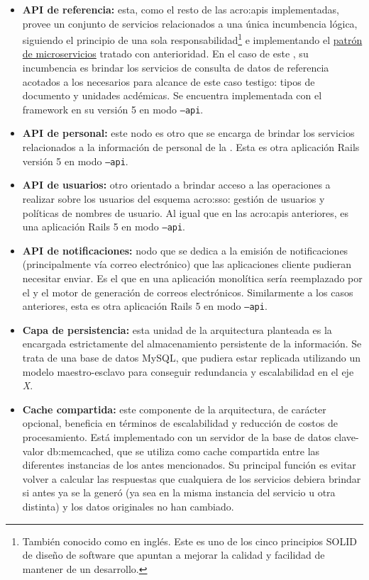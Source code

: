 \begin{itemize}
  \item \textbf{API de referencia:} esta, como el resto de las \glspl{acro:api} implementadas, provee un conjunto de servicios relacionados a una única incumbencia lógica, siguiendo el principio de una sola responsabilidad\footnote{También conocido como  en inglés. Este es uno de los cinco principios SOLID de diseño de software que apuntan a mejorar la calidad y facilidad de mantener de un desarrollo.} e implementando el \hyperref[microservicios]{patrón de microservicios} tratado con anterioridad. En el caso de este , su incumbencia es brindar los servicios de consulta de datos de referencia acotados a los necesarios para alcance de este caso testigo: tipos de documento y unidades acdémicas. Se encuentra implementada con el framework  en su versión 5 en modo \texttt{--api}.

  \item \textbf{API de personal:} este nodo es otro  que se encarga de brindar los servicios relacionados a la información de personal de la {\unlp}. Esta es otra aplicación Rails versión 5 en modo \texttt{--api}.

  \item \textbf{API de usuarios:} otro  orientado a brindar acceso a las operaciones a realizar sobre los usuarios del esquema \gls{acro:sso}: gestión de usuarios y políticas de nombres de usuario. Al igual que en las \glspl{acro:api} anteriores, es una aplicación Rails 5 en modo \texttt{--api}.

  \item \textbf{API de notificaciones:} nodo que se dedica a la emisión de notificaciones (principalmente vía correo electrónico) que las aplicaciones cliente pudieran necesitar enviar. Es el  que en una aplicación monolítica sería reemplazado por el  y el motor de generación de correos electrónicos. Similarmente a los casos anteriores, esta es otra aplicación Rails 5 en modo \texttt{--api}.

  \item \textbf{Capa de persistencia:} esta unidad de la arquitectura planteada es la encargada estrictamente del almacenamiento persistente de la información. Se trata de una base de datos MySQL, que pudiera estar replicada utilizando un modelo maestro-esclavo para conseguir redundancia y escalabilidad en el eje \textit{X}.

  \item \textbf{Cache compartida:} este componente de la arquitectura, de carácter opcional, beneficia en términos de escalabilidad y reducción de costos de procesamiento. Está implementado con un servidor de la base de datos clave-valor \gls{db:memcached}, que se utiliza como cache compartida entre las diferentes instancias de los  antes mencionados. Su principal función es evitar volver a calcular las respuestas que cualquiera de los servicios debiera brindar si antes ya se la generó (ya sea en la misma instancia del servicio u otra distinta) y los datos originales no han cambiado.
\end{itemize}

